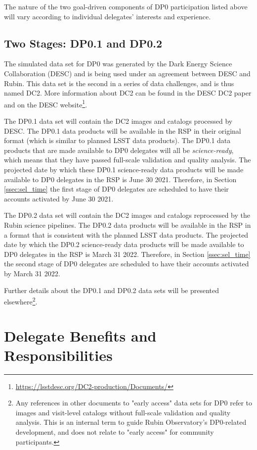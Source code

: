 \documentclass[DM,lsstdraft,authoryear,toc]{lsstdoc}
\begin{document}
The nature of the two goal-driven components of DP0 participation listed above will vary according to individual delegates' interests and experience.

\subsection{Two Stages: DP0.1 and DP0.2}\label{ssec:intro_stages}

The simulated data set for DP0 was generated by the Dark Energy Science Collaboration (DESC) and is being used under an agreement between DESC and Rubin.
This data set is the second in a series of data challenges, and is thus named DC2.
More information about DC2 can be found in the DESC DC2 paper \citep{2020arXiv201005926L} and on the DESC website\footnote{\url{https://lsstdesc.org/DC2-production/Documents/}}.

The DP0.1 data set will contain the DC2 images and catalogs processed by DESC.
The DP0.1 data products will be available in the RSP in their original format (which is similar to planned LSST data products).
The DP0.1 data products that are made available to DP0 delegates will all be \emph{science-ready}, which means that they have passed full-scale validation and quality analysis.
The projected date by which these DP0.1 science-ready data products will be made available to DP0 delegates in the RSP is June 30 2021.
Therefore, in Section \ref{ssec:sel_time} the first stage of DP0 delegates are scheduled to have their accounts activated by June 30 2021.

The DP0.2 data set will contain the DC2 images and catalogs reprocessed by the Rubin science pipelines.
The DP0.2 data products will be available in the RSP in a format that is consistent with the planned LSST data products.
The projected date by which the DP0.2 science-ready data products will be made available to DP0 delegates in the RSP is March 31 2022. 
Therefore, in Section \ref{ssec:sel_time} the second stage of DP0 delegates are scheduled to have their accounts activated by March 31 2022.

Further details about the DP0.1 and DP0.2 data sets will be presented elsewhere\footnote{Any references in other documents to "early access" data sets for DP0 refer to images and visit-level catalogs without full-scale validation and quality analysis. This is an internal term to guide Rubin Observatory's DP0-related development, and does not relate to "early access" for community participants.}.


\section{Delegate Benefits and Responsibilities}\label{sec:del}
\end{document}
